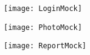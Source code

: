 \begin{figure}[H]
	\centering
	\texttt{[image: LoginMock]}
\end{figure}

\begin{figure}[H]
	\centering
	\texttt{[image: PhotoMock]}
\end{figure}

\begin{figure}[H]
	\centering
	\texttt{[image: ReportMock]}
\end{figure}